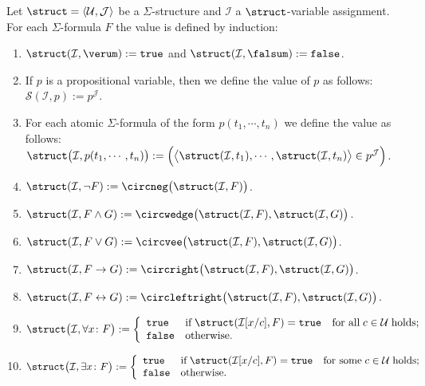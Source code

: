 \begin{Definition}
    Let $\struct = \langle \mathcal{U}, \mathcal{J} \rangle$ be a $\Sigma$-structure and $\mathcal{I}$ a $\struct$-variable assignment.  
    For each $\Sigma$-formula $F$ the value  is defined
    by induction:
    \begin{enumerate}
    \item $\struct(\mathcal{I},\verum) := \mathtt{true}$ and $\struct(\mathcal{I},\falsum) := \mathtt{false}$.
    \item If $p$ is a propositional variable, then we define the value of $p$ as follows:
          \\[0.2cm]
          \hspace*{1.3cm}
          $\mathcal{S}(\mathcal{I}, p) := p^\mathcal{J}$.
    \item For each atomic $\Sigma$-formula of the form $p(t_1, \cdots, t_n)$ we define the value  as follows: \\[0.2cm]
          \hspace*{1.3cm}
          $\struct\bigl(\mathcal{I}, p(t_1,\cdots,t_n)\bigr) := 
          \Bigl(\bigl\langle \struct(\mathcal{I}, t_1), \cdots, \struct(\mathcal{I}, t_n) \bigr\rangle \in p^\mathcal{J}\Bigr)$.
    \item $\struct(\mathcal{I}, \neg F) := \circneg\bigl(\struct(\mathcal{I}, F)\bigr)$.
    \item $\struct(\mathcal{I}, F \wedge G) := \circwedge\bigl(\struct(\mathcal{I}, F), \struct(\mathcal{I}, G)\bigr)$.
    \item $\struct(\mathcal{I}, F \vee G) := \circvee\bigl(\struct(\mathcal{I}, F), \struct(\mathcal{I}, G)\bigr)$.
    \item $\struct(\mathcal{I}, F \rightarrow G) := \circright\bigl(\struct(\mathcal{I}, F), \struct(\mathcal{I}, G)\bigr)$.
    \item $\struct(\mathcal{I}, F \leftrightarrow G) := \circleftright\bigl(\struct(\mathcal{I}, F), \struct(\mathcal{I}, G)\bigr)$.
    \item $\struct\bigl(\mathcal{I}, \forall x\colon F\bigr) := \left\{
      \begin{array}{ll}
         \mathtt{true}  & \mbox{if}\; \struct(\mathcal{I}[x/c], F) = \mathtt{true}\quad \mbox{for all}\; c\in \mathcal{U}\;\mbox{holds}; \\
         \mathtt{false} & \mbox{otherwise}.
      \end{array}
      \right.$
    \item $\struct\bigl(\mathcal{I}, \exists x \colon F\bigr) := \left\{
      \begin{array}{ll}
         \mathtt{true}  & \mbox{if}\; \struct(\mathcal{I}[x/c], F) = \mathtt{true}\quad \mbox{for some}\; c\in \mathcal{U}\;\mbox{holds}; \\
         \mathtt{false} & \mbox{otherwise}.
      \end{array}
      \right.$\eox    
    \end{enumerate}
\end{Definition}

